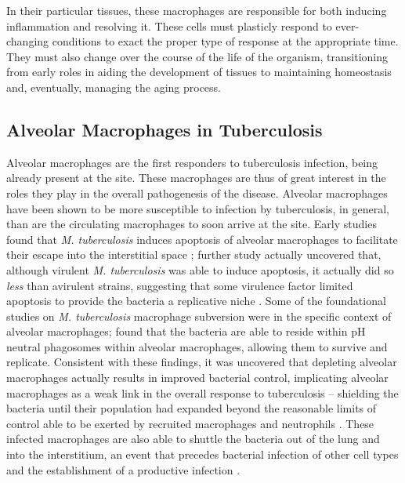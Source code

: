 In their particular tissues, these macrophages are responsible for both inducing inflammation and resolving it. These cells must plasticly respond to ever-changing conditions to exact the proper type of response at the appropriate time. They must also change over the course of the life of the organism, transitioning from early roles in aiding the development of tissues to maintaining homeostasis and, eventually, managing the aging process. 

\subsection{Alveolar Macrophages in Tuberculosis}\label{alvmac}

Alveolar macrophages are the first responders to tuberculosis infection, being already present at the site. These macrophages are thus of great interest in the roles they play in the overall pathogenesis of the disease. Alveolar macrophages have been shown to be more susceptible to infection by tuberculosis, in general, than are the circulating macrophages to soon arrive at the site. Early studies found that \textit{M. tuberculosis} induces apoptosis of alveolar macrophages to facilitate their escape into the interstitial space \citep{Keane1997}; further study actually uncovered that, although virulent \textit{M. tuberculosis} was able to induce apoptosis, it actually did so \textit{less} than avirulent strains, suggesting that some virulence factor limited apoptosis to provide the bacteria a replicative niche \citep{Keane2000, Cohen2018}. Some of the foundational studies on \textit{M. tuberculosis} macrophage subversion were in the specific context of alveolar macrophages; \citeauthor{Mwandumba2004} found that the bacteria are able to reside within pH neutral phagosomes within alveolar macrophages, allowing them to survive and replicate. Consistent with these findings, it was uncovered that depleting alveolar macrophages actually results in improved bacterial control, implicating alveolar macrophages as a weak link in the overall response to tuberculosis -- shielding the bacteria until their population had expanded beyond the reasonable limits of control able to be exerted by recruited macrophages and neutrophils \citep{Leemans2001}. These infected macrophages are also able to shuttle the bacteria out of the lung and into the interstitium, an event that precedes bacterial infection of other cell types and the establishment of a productive infection \citep{Cohen2018}.

